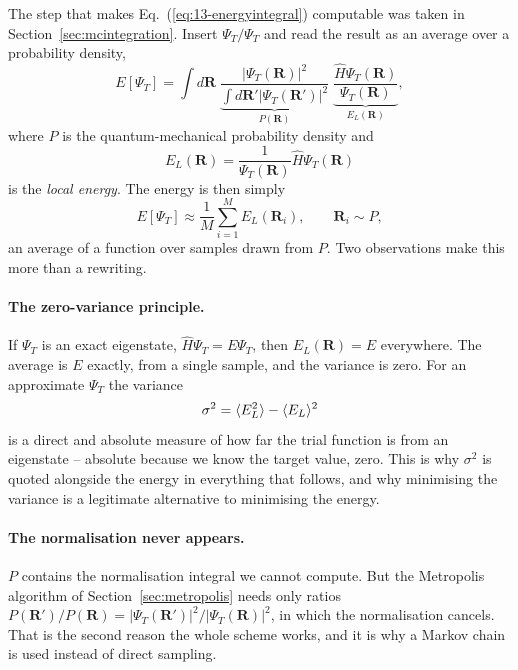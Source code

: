 The step that makes Eq.~(\ref{eq:13-energyintegral}) computable was taken in
Section~\ref{sec:mcintegration}.  Insert $\Psi_T/\Psi_T$ and read the result
as an average over a probability density,
\begin{equation}
  E[\Psi_T]
   = \int d\bm{R}\;
     \underbrace{\frac{|\Psi_T(\bm{R})|^2}
       {\int d\bm{R}'|\Psi_T(\bm{R}')|^2}}_{\textstyle P(\bm{R})}\;
     \underbrace{\frac{\hat{H}\Psi_T(\bm{R})}{\Psi_T(\bm{R})}}_{
       \textstyle E_L(\bm{R})},
  \label{eq:13-localenergyaverage}
\end{equation}
where $P$ is the quantum-mechanical probability density and
\begin{equation}
  \boxed{\;E_L(\bm{R}) = \frac{1}{\Psi_T(\bm{R})}\hat{H}\Psi_T(\bm{R})\;}
  \label{eq:13-localenergy}
\end{equation}
is the \emph{local energy}.  The energy is then simply
\begin{equation}
  E[\Psi_T] \approx \frac{1}{M}\sum_{i=1}^{M}E_L(\bm{R}_i),
  \qquad \bm{R}_i \sim P ,
  \label{eq:13-energyestimator}
\end{equation}
an average of a function over samples drawn from $P$.  Two observations make
this more than a rewriting.

\paragraph{The zero-variance principle.}
If $\Psi_T$ is an exact eigenstate, $\hat{H}\Psi_T=E\Psi_T$, then
$E_L(\bm{R})=E$ everywhere.  The average is $E$ exactly, from a single
sample, and the variance is zero.  For an approximate $\Psi_T$ the variance
\begin{equation}
  \sigma^2 = \langle E_L^2 \rangle - \langle E_L \rangle^2
  \label{eq:13-variance}
\end{equation}
is a direct and absolute measure of how far the trial function is from an
eigenstate -- absolute because we know the target value, zero.  This is why
$\sigma^2$ is quoted alongside the energy in everything that follows, and why
minimising the variance is a legitimate alternative to minimising the energy.

\paragraph{The normalisation never appears.}
$P$ contains the normalisation integral we cannot compute.  But the Metropolis
algorithm of Section~\ref{sec:metropolis} needs only ratios
$P(\bm{R}')/P(\bm{R}) = |\Psi_T(\bm{R}')|^2/|\Psi_T(\bm{R})|^2$, in which the
normalisation cancels.  That is the second reason the whole scheme works, and
it is why a Markov chain is used instead of direct sampling.

